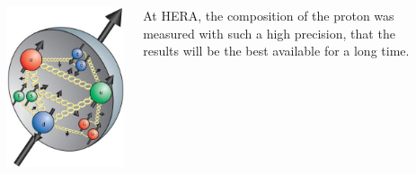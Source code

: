 \documentclass[10pt,t]{beamer}
\begin{document}
\begin{frame}
\begin{columns}
\begin{minipage}[c]{0.35\textwidth}
    \includegraphics[width=\textwidth]{hera-proton2}
\end{minipage}
\hfill
\begin{minipage}[c]{0.6\textwidth}\raggedright
    At HERA, the composition of the proton was measured with such a high precision, that the results will be the best available for a long time.
\end{minipage}
~\\[-\baselineskip]

\end{columns}
\end{frame}
\end{document}
